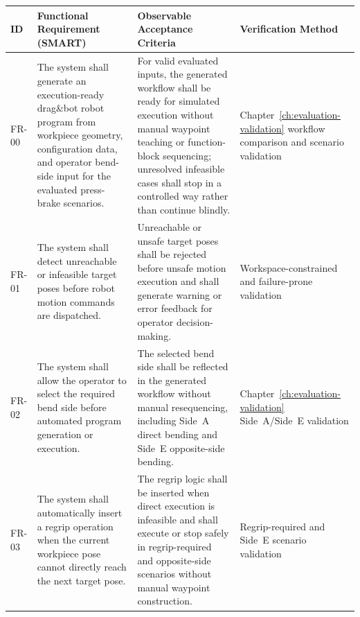 ﻿\begin{table}
\centering
\small

\setlength{\tabcolsep}{3pt}
\renewcommand{\arraystretch}{1.0}

\begin{tabularx}{\textheight}{
L{1.3cm}
L{8.0cm}
L{8.8cm}
L{4.0cm}
}

\hline
\textbf{ID} &
\textbf{Functional Requirement (SMART)} &
\textbf{Observable Acceptance Criteria} &
\textbf{Verification Method} \\
\hline

FR-00 &
The system shall generate an execution-ready drag\&bot robot program from workpiece geometry, configuration data, and operator bend-side input for the evaluated press-brake scenarios. &
For valid evaluated inputs, the generated workflow shall be ready for simulated execution without manual waypoint teaching or function-block sequencing; unresolved infeasible cases shall stop in a controlled way rather than continue blindly. &
Chapter~\ref{ch:evaluation-validation} workflow comparison and scenario validation \\
\hline
FR-01 &
The system shall detect unreachable or infeasible target poses before robot motion commands are dispatched. &
Unreachable or unsafe target poses shall be rejected before unsafe motion execution and shall generate warning or error feedback for operator decision-making. &
Workspace-constrained and failure-prone validation \\

\hline

FR-02 &
The system shall allow the operator to select the required bend side before automated program generation or execution. &
The selected bend side shall be reflected in the generated workflow without manual resequencing, including Side~A direct bending and Side~E opposite-side bending. &
Chapter~\ref{ch:evaluation-validation} Side~A/Side~E validation \\

\hline

FR-03 &
The system shall automatically insert a regrip operation when the current workpiece pose cannot directly reach the next target pose. &
The regrip logic shall be inserted when direct execution is infeasible and shall execute or stop safely in regrip-required and opposite-side scenarios without manual waypoint construction. &
Regrip-required and Side~E scenario validation \\


\end{tabularx}
\end{table}
